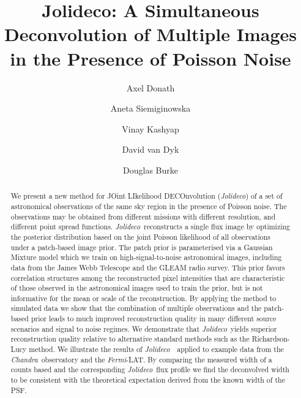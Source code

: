 \documentclass[twocolumn]{aastex631}
\newcommand{\chandra}{\textit{Chandra}~}
\newcommand{\ferminospace}{\textit{Fermi}-LAT}
\newcommand{\jolideco}{\textit{Jolideco}~}
\newcommand{\jolideconospace}{\textit{Jolideco}}
\begin{document}
    \title{%
    Jolideco: A Simultaneous Deconvolution of Multiple Images in the Presence of Poisson Noise}

    \author[0000-0003-4568-7005]{Axel Donath}
    \author[0000-0002-0905-7375]{Aneta Siemiginowska}
    \author[0000-0002-3869-7996]{Vinay Kashyap} 
    \author[0000-0002-0816-331X]{David van Dyk}
    \author[0000-0003-4428-7835]{Douglas Burke}
    


    \begin{abstract}
    
        We present a new method for JOint LIkelihood DECOnvolution (\jolideconospace) of a set of astronomical observations of the same sky region in the presence of Poisson noise. 
        The observations may be obtained from different missions with  different resolution, and different point spread functions. 
        \jolideco reconstructs a single flux image 
        by optimizing the posterior distribution based on the joint Poisson likelihood of all observations under a patch-based image prior. The patch prior is parameterised via a Gaussian Mixture model which we train on high-signal-to-noise astronomical images, including data from the  James Webb Telescope and the GLEAM radio survey. This prior favors correlation structures among the reconstructed pixel intensities that are characteristic of those observed in the astronomical images used to train the prior, but is not informative for the mean or scale of the reconstruction. By applying the method to simulated data we show that the combination of multiple observations and the patch-based prior leads to much improved reconstruction quality in many different source scenarios and signal to noise regimes. We demonstrate that \jolideco yields superior reconstruction quality relative to alternative standard methods such as the Richardson-Lucy method. We illustrate the results of \jolideco\ applied to example data from the \chandra observatory and the \ferminospace. By comparing the measured width of a counts based and the corresponding \jolideco flux profile we find the deconvolved width to be consistent with the theoretical expectation derived from the known width of the PSF.
    \end{abstract}
\end{document}
